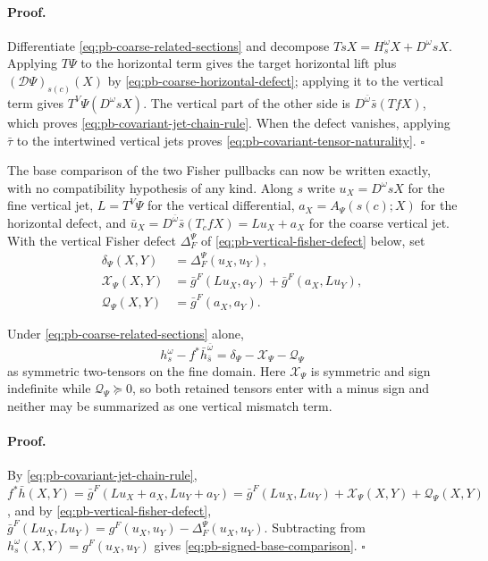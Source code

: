 \paragraph{Proof.}
Differentiate \eqref{eq:pb-coarse-related-sections} and decompose
$TsX=H_s^\omega X+D^\omega sX$.  Applying $T\Psi$ to the horizontal term
gives the target horizontal lift plus
$(\mathcal D\Psi)_{s(c)}(X)$ by
\eqref{eq:pb-coarse-horizontal-defect}; applying it to the vertical term
gives $T^V\Psi(D^\omega sX)$.  The vertical part of the other side is
$D^{\bar\omega}\bar s(TfX)$, which proves
\eqref{eq:pb-covariant-jet-chain-rule}.  When the defect vanishes, applying
$\bar\tau$ to the intertwined vertical jets proves
\eqref{eq:pb-covariant-tensor-naturality}.  $\square$

The base comparison of the two Fisher pullbacks can now be written exactly,
with no compatibility hypothesis of any kind.  Along $s$ write
$u_X=D^\omega sX$ for the fine vertical jet, $L=T^V\Psi$ for the vertical
differential, $a_X=A_\Psi(s(c);X)$ for the horizontal defect, and
$\bar u_X=D^{\bar\omega}\bar s(T_cfX)=Lu_X+a_X$ for the coarse vertical jet.
With the vertical Fisher defect $\Delta_F^\Psi$ of
\eqref{eq:pb-vertical-fisher-defect} below, set
\begin{align}
\delta_\Psi(X,Y)&=\Delta_F^\Psi(u_X,u_Y),
\label{eq:pb-base-fisher-defect}\\
\mathcal X_\Psi(X,Y)&=\bar g^F(Lu_X,a_Y)+\bar g^F(a_X,Lu_Y),
\label{eq:pb-cross-anomaly-tensor}\\
\mathcal Q_\Psi(X,Y)&=\bar g^F(a_X,a_Y).
\label{eq:pb-quadratic-anomaly-tensor}
\end{align}

Under \eqref{eq:pb-coarse-related-sections} alone,
\begin{equation}
h_s^\omega-f^*\bar h_{\bar s}^{\bar\omega}
=\delta_\Psi-\mathcal X_\Psi-\mathcal Q_\Psi
\label{eq:pb-signed-base-comparison}
\end{equation}
as symmetric two-tensors on the fine domain.  Here $\mathcal X_\Psi$ is
symmetric and sign indefinite while $\mathcal Q_\Psi\succeq0$, so both retained
tensors enter with a minus sign and neither may be summarized as one vertical
mismatch term.  

\paragraph{Proof.}
By \eqref{eq:pb-covariant-jet-chain-rule},
$f^*\bar h(X,Y)=\bar g^F(Lu_X+a_X,Lu_Y+a_Y)
=\bar g^F(Lu_X,Lu_Y)+\mathcal X_\Psi(X,Y)+\mathcal Q_\Psi(X,Y)$, and by
\eqref{eq:pb-vertical-fisher-defect},
$\bar g^F(Lu_X,Lu_Y)=g^F(u_X,u_Y)-\Delta_F^\Psi(u_X,u_Y)$.  Subtracting from
$h_s^\omega(X,Y)=g^F(u_X,u_Y)$ gives
\eqref{eq:pb-signed-base-comparison}.  $\square$

